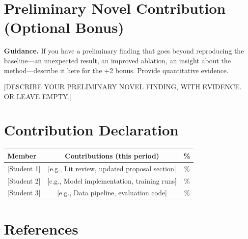 \documentclass[11pt, letterpaper]{article}
\begin{document}
\section{Preliminary Novel Contribution (Optional Bonus)}

\begin{guidancebox}
\textbf{Guidance.} If you have a preliminary finding that goes beyond
reproducing the baseline---an unexpected result, an improved ablation,
an insight about the method---describe it here for the +2 bonus.
Provide quantitative evidence.
\end{guidancebox}

[DESCRIBE YOUR PRELIMINARY NOVEL FINDING, WITH EVIDENCE. OR LEAVE EMPTY.]

\section{Contribution Declaration}

\begin{tabular}{lcc}
\toprule
\textbf{Member} & \textbf{Contributions (this period)} & \textbf{\%} \\
\midrule
{[Student 1]} & [e.g., Lit review, updated proposal section] & \% \\
{[Student 2]} & [e.g., Model implementation, training runs] & \% \\
{[Student 3] }& [e.g., Data pipeline, evaluation code] & \% \\
\bottomrule
\end{tabular}

\section{References}

\begin{enumerate}[label={[\arabic*]},leftmargin=*]
  \item [Author(s), Year. ``Title.'' \textit{Venue}. arXiv:XXXX.XXXXX]
  \item [\ldots]
\end{enumerate}
\end{document}
